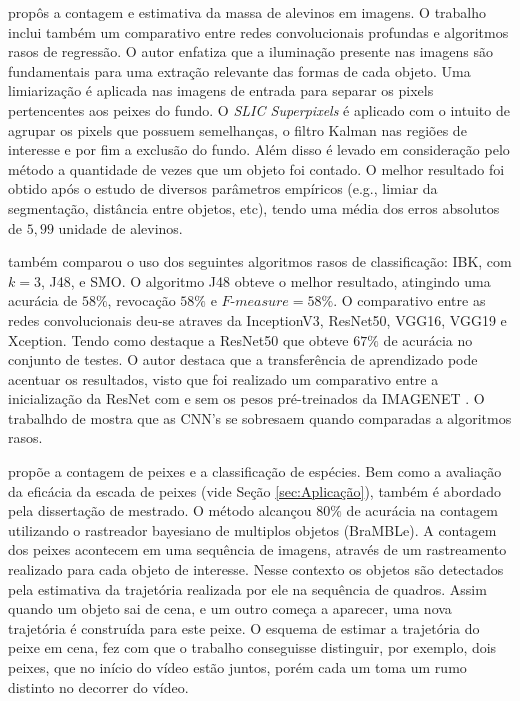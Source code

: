 \cite{Junior2019UFMS} propôs a contagem e estimativa da massa de alevinos em imagens. O trabalho inclui também um comparativo entre redes convolucionais profundas e algoritmos rasos de regressão.
O autor enfatiza que a iluminação presente nas imagens são fundamentais para uma extração relevante das formas de cada objeto. 
Uma limiarização é aplicada nas imagens de entrada para separar os pixels pertencentes aos peixes do fundo.
O \textit{SLIC Superpixels} \cite{SLIC} é aplicado com o intuito de agrupar os pixels que possuem semelhanças, o filtro Kalman \cite{Kalman} nas regiões de interesse e por fim a exclusão do fundo. Além disso é levado em consideração pelo método a quantidade de vezes que um objeto foi contado.
O melhor resultado foi obtido após o estudo de diversos parâmetros empíricos (e.g., limiar da segmentação, distância entre objetos, etc), tendo uma média dos erros absolutos de $5,99$ unidade de alevinos.

\cite{Junior2019UFMS} também comparou o uso dos seguintes algoritmos rasos de classificação: IBK, com $k = 3$, J48, e SMO. O algoritmo J48 obteve o melhor resultado, atingindo uma acurácia de $58\%$, revocação 
$58\%$ e $\textit{F-measure} = 58\%$. O comparativo entre as redes convolucionais deu-se atraves da InceptionV3, ResNet50, VGG16, VGG19 e Xception. Tendo como destaque a ResNet50 \cite{ResNet50} que obteve $67\%$ de acurácia no conjunto de testes.
O autor destaca que a transferência de aprendizado pode acentuar os resultados, visto que foi realizado um comparativo entre a inicialização da ResNet com e sem os pesos pré-treinados da IMAGENET \cite{IMAGENET}. O trabalhdo de \cite{Junior2019UFMS} mostra que as CNN's se sobresaem quando comparadas a algoritmos rasos.


\cite{Erikson} propõe a contagem de peixes e a classificação de espécies.
Bem como a avaliação da eficácia da escada de peixes (vide Seção \ref{sec:Aplicação}), também é abordado pela dissertação de mestrado.
O método alcançou $80\%$ de acurácia na contagem utilizando o rastreador bayesiano de multiplos objetos (BraMBLe). 
A contagem dos peixes acontecem em uma sequência de imagens, através de um rastreamento realizado para cada objeto de interesse. Nesse contexto os objetos são detectados pela estimativa da trajetória realizada por ele na sequência de quadros. Assim quando um objeto sai de cena, e um outro começa a aparecer, uma nova trajetória é construída para este peixe. O esquema de estimar a trajetória do peixe em cena, fez com que o trabalho conseguisse distinguir, por exemplo, dois peixes, que no início do vídeo estão juntos, porém cada um toma um rumo distinto no decorrer do vídeo.

